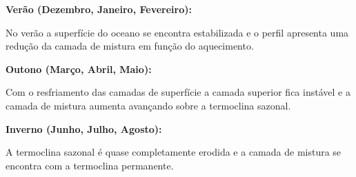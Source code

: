\documentclass[letterpaper,portuguese,12pt,pdftex]{exam}
\begin{document}
\begin{questions}
\begin{solution}
  {\bf Verão (Dezembro, Janeiro, Fevereiro):}

  No verão a superfície do oceano se encontra estabilizada e o perfil apresenta
  uma redução da camada de mistura em função do aquecimento.

  {\bf Outono (Março, Abril, Maio):}

  Com o resfriamento das camadas de superfície a camada superior fica instável
  e a camada de mistura aumenta avançando sobre a termoclina sazonal.

  {\bf Inverno (Junho, Julho, Agosto):}

  A termoclina sazonal é quase completamente erodida e a camada de mistura
  se encontra com a termoclina permanente.
  \end{solution}

\end{questions}
\end{document}
